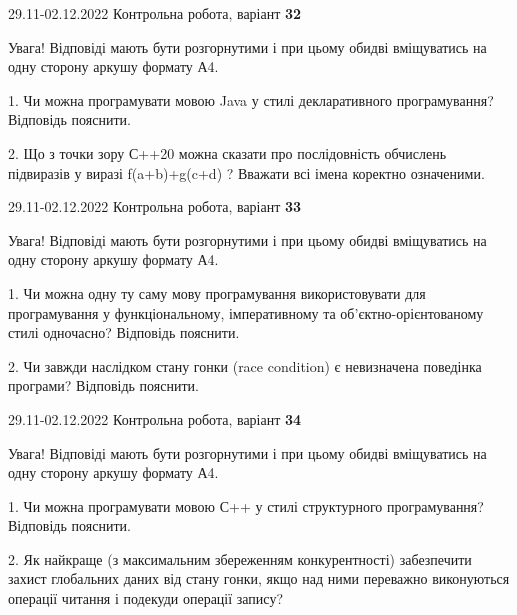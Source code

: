 \documentclass[11pt, ukrainian]{article}
\begin{document}
\vspace{4mm}



{29.11-02.12.2022 Контрольна робота, варіант  \No \textbf { 32 }\par}
Увага! Відповіді мають бути розгорнутими і при цьому обидві вміщуватись на одну сторону аркушу формату А4.

{
\begin {large}

1. Чи можна програмувати мовою Java у стилі декларативного програмування? Відповідь пояснити.%

2. Що з точки зору С++20 можна сказати про послідовність обчислень підвиразів у виразі f(a+b)+g(c+d) ? Вважати всі імена коректно означеними.

\end {large}}

\vspace{4mm}
\newpage
{29.11-02.12.2022 Контрольна робота, варіант  \No \textbf { 33 }\par}
Увага! Відповіді мають бути розгорнутими і при цьому обидві вміщуватись на одну сторону аркушу формату А4.

{
\begin {large}

1. Чи можна одну ту саму мову програмування використовувати для програмування у функціональному, імперативному та об’єктно-орієнтованому стилі одночасно? Відповідь пояснити.%

2. Чи завжди наслідком стану гонки (race condition) є невизначена поведінка програми? Відповідь пояснити.

\end {large}}

\vspace{4mm}



{29.11-02.12.2022 Контрольна робота, варіант  \No \textbf { 34 }\par}
Увага! Відповіді мають бути розгорнутими і при цьому обидві вміщуватись на одну сторону аркушу формату А4.

{
\begin {large}

1. Чи можна програмувати мовою С++ у стилі структурного програмування? Відповідь пояснити.%

2. Як найкраще (з максимальним збереженням конкурентності) забезпечити захист глобальних даних від стану гонки, якщо над ними переважно виконуються операції читання і подекуди операції запису?

\end {large}}
\end{document}
